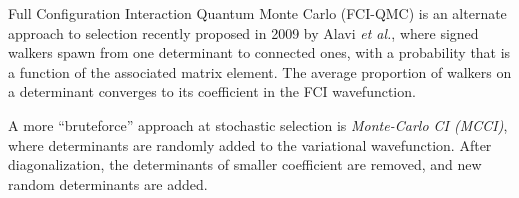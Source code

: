 \documentclass[./thesis.tex]{subfiles}
\begin{document}
Full Configuration Interaction Quantum Monte Carlo (FCI-QMC) is an alternate approach to selection recently proposed in 2009 by Alavi \textit{et al.},\cite{Booth_2009,Booth_2010,Cleland_2010} where signed walkers spawn from one determinant to connected ones, with a probability that is a function of the associated matrix element. The average proportion of walkers on a determinant converges to its coefficient in the FCI wavefunction.

A more ``bruteforce'' approach at stochastic selection is \emph{Monte-Carlo CI (MCCI)},\cite{Greer_1995,Greer_1998} where determinants are randomly added to the variational wavefunction. After diagonalization, the determinants of smaller coefficient are removed, and new random determinants are added.
\end{document}
